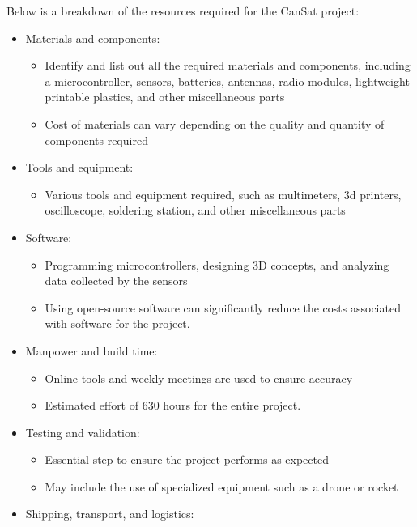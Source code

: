 Below is a breakdown of the resources required for the CanSat project:
\begin{itemize}[leftmargin=1cm, itemindent=0.25cm, noitemsep, topsep=0pt, label=$\bullet$]
\item Materials and components:
\begin{itemize}[label=, noitemsep, topsep=1pt]
\item Identify and list out all the required materials and components, including a microcontroller, sensors, batteries, antennas, radio modules, lightweight printable plastics, and other miscellaneous parts
\item Cost of materials can vary depending on the quality and quantity of components required
\end{itemize}
\item Tools and equipment:
\begin{itemize}[label=, noitemsep, topsep=1pt]
\item Various tools and equipment required, such as multimeters, 3d printers, oscilloscope, soldering station, and other miscellaneous parts
\end{itemize}
\item Software:
\begin{itemize}[label=, noitemsep, topsep=1pt]
\item Programming microcontrollers, designing 3D concepts, and analyzing data collected by the sensors
\item Using open-source software can significantly reduce the costs associated with software for the project.
\end{itemize}
\item Manpower and build time:
\begin{itemize}[label=, noitemsep, topsep=1pt]
\item Online tools and weekly meetings are used to ensure accuracy
\item Estimated effort of 630 hours for the entire project.
\end{itemize}
\item Testing and validation:
\begin{itemize}[label=, noitemsep, topsep=1pt]
\item Essential step to ensure the project performs as expected
\item May include the use of specialized equipment such as a drone or rocket
\end{itemize}
\item Shipping, transport, and logistics:

\end{itemize}
